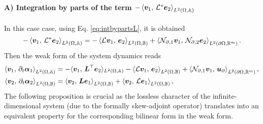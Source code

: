 \paragraph{A) Integration by parts of the term $-\inner[L^2(\Omega, \mathbb{A})]{\bm{v}_1}{\mathcal{L}^*\bm{e}_2}$}
In this case case, using Eq. \eqref{eq:intbypartsL}, it is obtained 
\begin{equation}
-\inner[L^2(\Omega, \mathbb{A})]{\bm{v}_1}{\mathcal{L}^*\bm{e}_2} = -\inner[L^2(\Omega, \mathbb{B})]{\mathcal{L}\bm{v}_1}{\bm{e}_2} + \inner[L^2(\partial \Omega, \mathbb{R}^m)]{\mathcal{N}_{\partial, 1} \bm{v}_1}{\mathcal{N}_{\partial, 2} \bm{e}_2}.
\end{equation}
Then the weak form of the system dynamics  reads 
\begin{equation}\label{eq:weak_dyn_intJ1}
\begin{aligned}
\inner[L^2(\Omega, \mathbb{A})]{\bm{v}_1}{\partial_t \bm{\alpha}_1} &=   -  \langle{\bm{v}_1}, \,{\bm{L}^\top \bm{e}_2}\rangle_{L^2(\Omega, \mathbb{A})}  -\inner[L^2(\Omega, \mathbb{B})]{\mathcal{L}\bm{v}_1}{\bm{e}_2} + \inner[L^2(\partial \Omega, \mathbb{R}^m)]{\mathcal{N}_{\partial, 1} \bm{v}_1}{\bm{u}_\partial}, \\
\inner[L^2(\Omega, \mathbb{B})]{\bm{v}_2}{\partial_t \bm{\alpha}_2} &=   \inner[L^2(\Omega, \mathbb{B})]{\bm{v}_2}{\bm{L}\bm{e}_1} + \inner[L^2(\Omega, \mathbb{B})]{\bm{v}_2}{\mathcal{L}\bm{e}_1},
\end{aligned}
\end{equation}
The following proposition is crucial as the lossless character of the infinite-dimensional system (due to the formally skew-adjoint operator) translates into an equivalent property for the corresponding bilinear form in the weak form.

